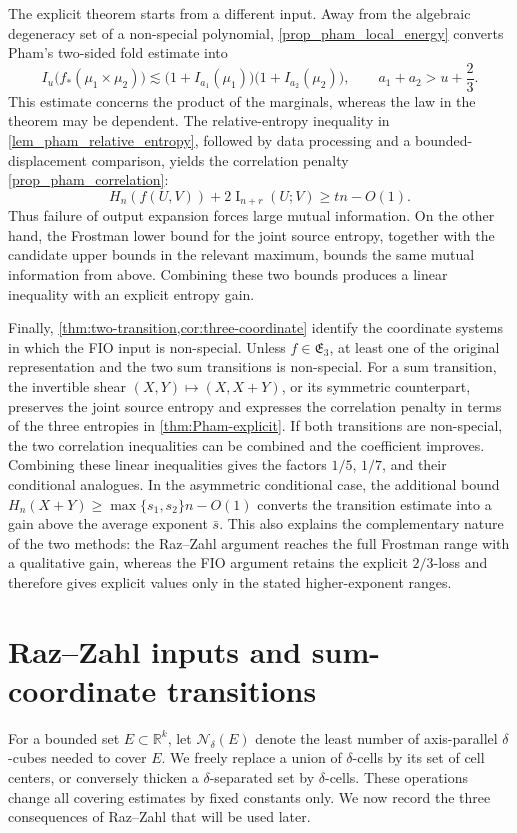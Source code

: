 \documentclass[11pt]{article}
\begin{document}
The explicit theorem starts from a different input.  Away from the
algebraic degeneracy set of a non-special polynomial,
\cref{prop_pham_local_energy} converts Pham's two-sided fold estimate
into
\[
 I_u\bigl(f_*(\mu_1\times\mu_2)\bigr)
 \lesssim
 \bigl(1+I_{a_1}(\mu_1)\bigr)
 \bigl(1+I_{a_2}(\mu_2)\bigr),
 \qquad a_1+a_2>u+\frac{2}{3}.
\]
This estimate concerns the product of the marginals, whereas the law
in the theorem may be dependent.  The relative-entropy inequality in
\cref{lem_pham_relative_entropy}, followed by data processing and a
bounded-displacement comparison, yields the correlation penalty
\cref{prop_pham_correlation}:
\[
 H_n(f(U,V))+2\operatorname{I}_{n+r}(U;V)\ge tn-O(1).
\]
Thus failure of output expansion forces large mutual information.
On the other hand, the Frostman lower bound for the joint source entropy,
together with the candidate upper bounds in the relevant maximum,
bounds the same mutual information from above.  Combining these two
bounds produces a linear inequality with an explicit entropy gain.

Finally, \cref{thm:two-transition,cor:three-coordinate} identify the
coordinate systems in which the FIO input is non-special.  Unless
\(f\in\mathfrak E_3\), at least one of the original representation
and the two sum transitions is non-special.  For a sum transition,
the invertible shear \((X,Y)\mapsto(X,X+Y)\), or its symmetric
counterpart, preserves the joint source entropy and expresses the
correlation penalty in terms of the three entropies in
\cref{thm:Pham-explicit}.  If both transitions are non-special, the two
correlation inequalities can be combined and the coefficient
improves.  Combining these linear inequalities gives the factors
\(1/5\), \(1/7\), and their conditional analogues.  In the
asymmetric conditional case, the additional bound
\(H_n(X+Y)\ge\max\{s_1,s_2\}n-O(1)\) converts the transition
estimate into a gain above the average exponent \(\bar s\).  This also explains
the complementary nature of the two methods: the Raz--Zahl argument
reaches the full Frostman range with a qualitative gain, whereas the
FIO argument retains the explicit \(2/3\)-loss and therefore gives
explicit values only in the stated higher-exponent ranges.

\section{Raz--Zahl inputs and sum-coordinate transitions}
\label{sec:RZ-inputs}

For a bounded set \(E\subset\mathbb R^k\), let \(\mathcal N_\delta(E)\) denote
the least number of axis-parallel \(\delta\)-cubes needed to cover
\(E\).  We freely replace a union of \(\delta\)-cells by its set of
cell centers, or conversely thicken a \(\delta\)-separated set by
\(\delta\)-cells.  These operations change all covering estimates by
fixed constants only.  We now record the three consequences of
Raz--Zahl that will be used later.
\end{document}
